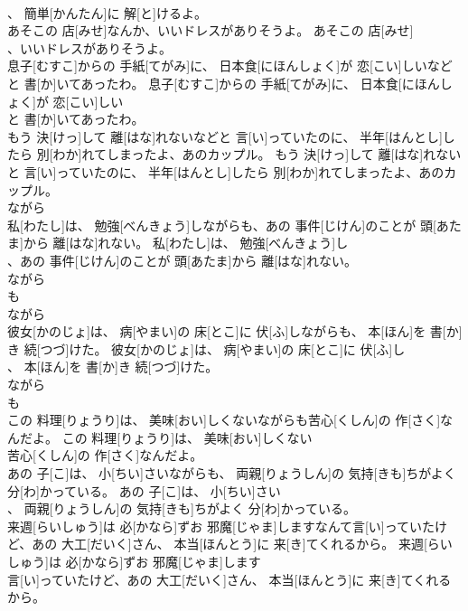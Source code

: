 \documentclass[8pt]{extreport}
\begin{document}
\begin{CJK}{UTF8}{min}
\\	、 簡単[かんたん]に 解[と]けるよ。	
\\	あそこの 店[みせ]なんか、いいドレスがありそうよ。	あそこの 店[みせ]
\\	、いいドレスがありそうよ。	
\\	息子[むすこ]からの 手紙[てがみ]に、 日本食[にほんしょく]が 恋[こい]しいなどと 書[か]いてあったわ。	息子[むすこ]からの 手紙[てがみ]に、 日本食[にほんしょく]が 恋[こい]しい
\\	と 書[か]いてあったわ。	
\\	もう 決[けっ]して 離[はな]れないなどと 言[い]っていたのに、 半年[はんとし]したら 別[わか]れてしまったよ、あのカップル。	もう 決[けっ]して 離[はな]れない
\\	と 言[い]っていたのに、 半年[はんとし]したら 別[わか]れてしまったよ、あのカップル。	
\\	ながら 
\\	私[わたし]は、 勉強[べんきょう]しながらも、あの 事件[じけん]のことが 頭[あたま]から 離[はな]れない。	私[わたし]は、 勉強[べんきょう]し
\\	、あの 事件[じけん]のことが 頭[あたま]から 離[はな]れない。	
\\	ながら 
\\	も
\\	ながら 
\\	彼女[かのじょ]は、 病[やまい]の 床[とこ]に 伏[ふ]しながらも、 本[ほん]を 書[か]き 続[つづ]けた。	彼女[かのじょ]は、 病[やまい]の 床[とこ]に 伏[ふ]し
\\	、 本[ほん]を 書[か]き 続[つづ]けた。	
\\	ながら 
\\	も
\\	この 料理[りょうり]は、 美味[おい]しくないながらも苦心[くしん]の 作[さく]なんだよ。	この 料理[りょうり]は、 美味[おい]しくない
\\	苦心[くしん]の 作[さく]なんだよ。	
\\	あの 子[こ]は、 小[ちい]さいながらも、 両親[りょうしん]の 気持[きも]ちがよく 分[わ]かっている。	あの 子[こ]は、 小[ちい]さい
\\	、 両親[りょうしん]の 気持[きも]ちがよく 分[わ]かっている。	
\\	来週[らいしゅう]は 必[かなら]ずお 邪魔[じゃま]しますなんて言[い]っていたけど、あの 大工[だいく]さん、 本当[ほんとう]に 来[き]てくれるから。	来週[らいしゅう]は 必[かなら]ずお 邪魔[じゃま]します
\\	言[い]っていたけど、あの 大工[だいく]さん、 本当[ほんとう]に 来[き]てくれるから。	

\end{CJK}
\end{document}
